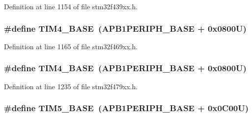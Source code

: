 Definition at line 1154 of file stm32f439xx.\+h.

\subsubsection[{\texorpdfstring{T\+I\+M4\+\_\+\+B\+A\+SE}{TIM4_BASE}}]{\setlength{\rightskip}{0pt plus 5cm}\#define T\+I\+M4\+\_\+\+B\+A\+SE~({\bf A\+P\+B1\+P\+E\+R\+I\+P\+H\+\_\+\+B\+A\+SE} + 0x0800\+U)}\hypertarget{group___peripheral__memory__map_ga56e2d44b0002f316527b8913866a370d}{}\label{group___peripheral__memory__map_ga56e2d44b0002f316527b8913866a370d}


Definition at line 1165 of file stm32f469xx.\+h.

\subsubsection[{\texorpdfstring{T\+I\+M4\+\_\+\+B\+A\+SE}{TIM4_BASE}}]{\setlength{\rightskip}{0pt plus 5cm}\#define T\+I\+M4\+\_\+\+B\+A\+SE~({\bf A\+P\+B1\+P\+E\+R\+I\+P\+H\+\_\+\+B\+A\+SE} + 0x0800\+U)}\hypertarget{group___peripheral__memory__map_ga56e2d44b0002f316527b8913866a370d}{}\label{group___peripheral__memory__map_ga56e2d44b0002f316527b8913866a370d}


Definition at line 1235 of file stm32f479xx.\+h.

\subsubsection[{\texorpdfstring{T\+I\+M5\+\_\+\+B\+A\+SE}{TIM5_BASE}}]{\setlength{\rightskip}{0pt plus 5cm}\#define T\+I\+M5\+\_\+\+B\+A\+SE~({\bf A\+P\+B1\+P\+E\+R\+I\+P\+H\+\_\+\+B\+A\+SE} + 0x0\+C00\+U)}\hypertarget{group___peripheral__memory__map_ga3e1671477190d065ba7c944558336d7e}{}\label{group___peripheral__memory__map_ga3e1671477190d065ba7c944558336d7e}


